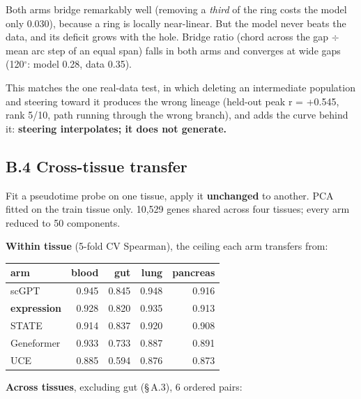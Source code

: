Both arms bridge remarkably well (removing a \emph{third} of the ring costs the model only 0.030), because
a ring is locally near-linear. But the model never beats the data, and its deficit grows with the hole.
Bridge ratio (chord across the gap \(\div\) mean arc step of an equal span) falls in both arms and converges
at wide gaps (120\(^{\circ}\): model 0.28, data 0.35).

This matches the one real-data test, in which deleting an intermediate population and steering toward it
produces the wrong lineage (held-out peak r = +0.545, rank 5/10, path running through the wrong
branch), and adds the curve behind it: \textbf{steering interpolates; it does not generate.}

\hypertarget{b.4-cross-tissue-transfer}{%
\subsection{B.4 Cross-tissue transfer}\label{b.4-cross-tissue-transfer}}

Fit a pseudotime probe on one tissue, apply it \textbf{unchanged} to another. PCA fitted on the train tissue
only. 10,529 genes shared across four tissues; every arm reduced to 50 components.

\textbf{Within tissue} (5-fold CV Spearman), the ceiling each arm transfers from:

\begin{longtable}[]{@{}lrrrr@{}}
\toprule\noalign{}
arm & blood & gut & lung & pancreas \\
\midrule\noalign{}
\endhead
\bottomrule\noalign{}
\endlastfoot
scGPT & 0.945 & 0.845 & 0.948 & 0.916 \\
\textbf{expression} & 0.928 & 0.820 & 0.935 & 0.913 \\
STATE & 0.914 & 0.837 & 0.920 & 0.908 \\
Geneformer & 0.933 & 0.733 & 0.887 & 0.891 \\
UCE & 0.885 & 0.594 & 0.876 & 0.873 \\
\end{longtable}

\textbf{Across tissues}, excluding gut (\S\,A.3), 6 ordered pairs:

